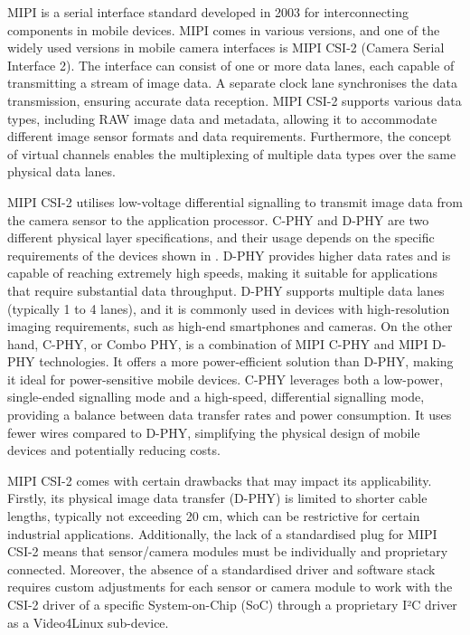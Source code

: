 MIPI\cite{mipi} is a serial interface standard developed in 2003 for interconnecting components in mobile devices. MIPI comes in various versions, and one of the widely used versions in mobile camera interfaces is MIPI CSI-2 (Camera Serial Interface 2). The interface can consist of one or more data lanes, each capable of transmitting a stream of image data. A separate clock lane synchronises the data transmission, ensuring accurate data reception. MIPI CSI-2 supports various data types, including RAW image data and metadata, allowing it to accommodate different image sensor formats and data requirements. Furthermore, the concept of virtual channels enables the multiplexing of multiple data types over the same physical data lanes.

MIPI CSI-2 utilises low-voltage differential signalling to transmit image data from the camera sensor to the application processor. C-PHY and D-PHY are two different physical layer specifications, and their usage depends on the specific requirements of the devices shown in . D-PHY provides higher data rates and is capable of reaching extremely high speeds, making it suitable for applications that require substantial data throughput. D-PHY supports multiple data lanes (typically 1 to 4 lanes), and it is commonly used in devices with high-resolution imaging requirements, such as high-end smartphones and cameras. On the other hand, C-PHY, or Combo PHY, is a combination of MIPI C-PHY and MIPI D-PHY technologies. It offers a more power-efficient solution than D-PHY, making it ideal for power-sensitive mobile devices. C-PHY leverages both a low-power, single-ended signalling mode and a high-speed, differential signalling mode, providing a balance between data transfer rates and power consumption. It uses fewer wires compared to D-PHY, simplifying the physical design of mobile devices and potentially reducing costs.

MIPI CSI-2 comes with certain drawbacks that may impact its applicability. Firstly, its physical image data transfer (D-PHY) is limited to shorter cable lengths, typically not exceeding 20 cm, which can be restrictive for certain industrial applications. Additionally, the lack of a standardised plug for MIPI CSI-2 means that sensor/camera modules must be individually and proprietary connected. Moreover, the absence of a standardised driver and software stack requires custom adjustments for each sensor or camera module to work with the CSI-2 driver of a specific System-on-Chip (SoC) through a proprietary I²C driver as a Video4Linux sub-device.  

